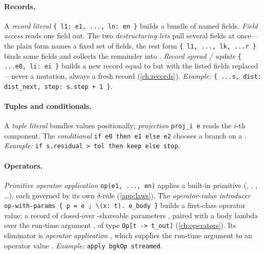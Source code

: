 \paragraph{Records.} A \emph{record literal}
\lstinline[style=l4style]|{ l1: e1, ..., ln: en }| builds a bundle of named
fields. \emph{Field access}  reads one field out. The two
\emph{destructuring lets} pull several fields at once---the plain form names a
fixed set of fields, the rest form
\lstinline[style=l4style]|{ l1, ..., lk, ...r }| binds some fields and collects
the remainder into . \emph{Record spread / update}
\lstinline[style=l4style]|{ ...e0, li: ei }| builds a new record equal to
 but with the listed fields replaced---never a mutation, always a fresh
record (\cref{ch:records}). \emph{Example:}
\lstinline[style=l4style]|{ ...s, dist: dist_next, step: s.step + 1 }|.

\paragraph{Tuples and conditionals.} A \emph{tuple literal}
 bundles values positionally; \emph{projection}
\lstinline[style=l4style]|proj_i e| reads the $i$-th component. The
\emph{conditional} \lstinline[style=l4style]|if e0 then e1 else e2| chooses a
branch on a . \emph{Example:}
\lstinline[style=l4style]|if s.residual > tol then keep else stop|.

\paragraph{Operators.} \emph{Primitive operator application}
\lstinline[style=l4style]|op(e1, ..., en)| applies a built-in primitive
(, , , \dots), each governed by its own
$\delta$-rule (\cref{app:laws}). The \emph{operator-value introducer}
\lstinline[style=l4style]|op-with-params { p = e ; \(x: t). e_body }| builds a
first-class operator value: a record of closed-over \code{!}-shareable parameters
, paired with a body lambda over the run-time argument , of type
\lstinline[style=l4style]|Op[t -> t_out]| (\cref{ch:operators}). Its eliminator is \emph{operator
application} , which supplies the run-time argument to an operator
value . \emph{Example:}
\lstinline[style=l4style]|apply bgkOp streamed|.

